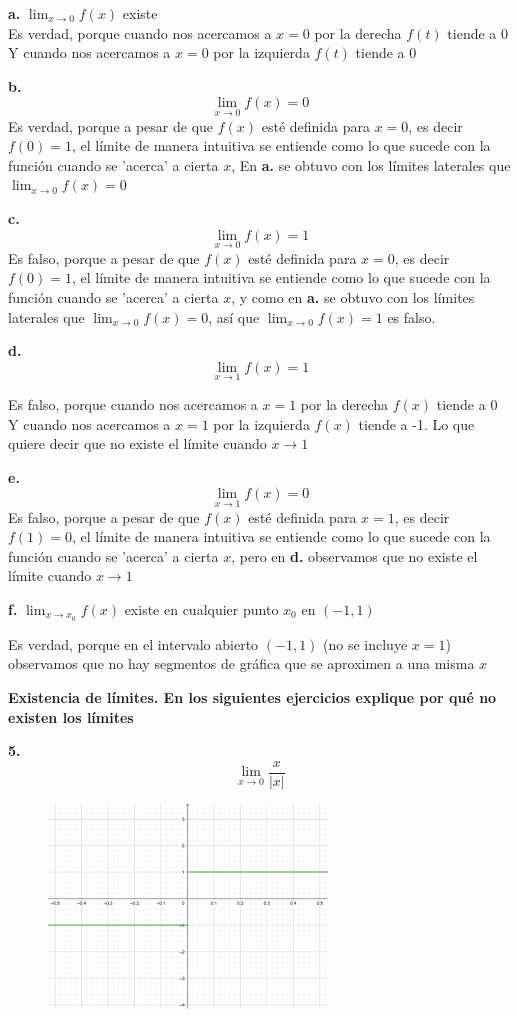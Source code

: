 \documentclass[12pt, letterpaper]{article}
\begin{document}
\textbf{a.} $\lim_{x \to 0} f(x)$ existe \\
Es verdad, porque cuando nos acercamos a $x = 0$  por la derecha $f(t)$ tiende a 0\\
Y cuando nos acercamos a $x = 0$ por la izquierda $f(t)$ tiende a 0

\textbf{b.} \[ \lim_{x \to 0} f(x) = 0\]
Es verdad, porque  a pesar de que  $f(x)$ esté definida para $x = 0$, es decir $f(0)= 1$, el límite de manera intuitiva se entiende como lo que sucede con la función cuando se  'acerca' a cierta $x$, En \textbf{a.} se obtuvo con los límites laterales  que $\lim_{x \to 0} f(x) = 0$

\textbf{c.} \[ \lim_{x \to 0} f(x) = 1\]
Es falso, porque  a pesar de que  $f(x)$ esté definida para $x = 0$, es decir $f(0)= 1$, el límite de manera intuitiva se entiende como lo que sucede con la función cuando se  'acerca' a cierta $x$, y como en \textbf{a.} se obtuvo con los límites laterales que $\lim_{x \to 0} f(x) = 0$, así que $\lim_{x \to 0} f(x) = 1$   es falso.

\textbf{d.} \[ \lim_{x \to 1} f(x) = 1\]

Es falso, porque cuando nos acercamos a $x = 1$  por la derecha $f(x)$ tiende a 0\\
Y cuando nos acercamos a $x = 1$ por la izquierda $f(x)$ tiende a -1. Lo que quiere decir que no existe el límite cuando $x \to 1$

\textbf{e.}  \[ \lim_{x \to 1} f(x) = 0\]
Es falso, porque  a pesar de que  $f(x)$ esté definida para $x = 1$, es decir $f(1)= 0$, el límite de manera intuitiva se entiende como lo que sucede con la función cuando se  'acerca' a cierta $x$, pero en \textbf{d.} observamos que no existe el límite cuando $x \to 1$

\textbf{f.} $\lim_{x \to x_0} f(x)$ existe en cualquier punto $x_0$ en $(-1,1)$

Es verdad, porque en el intervalo abierto $(-1,1)$ (no se incluye $x = 1$) observamos que no hay segmentos de gráfica que se aproximen a una misma $x$ 

\textbf{Existencia de límites. En los siguientes ejercicios explique por qué no existen los límites}

\textbf{5.} \[ \lim_{x \to 0} \frac{x}{|x|}\]

\begin{figure}[ht]
\centering
\includegraphics[width=20em]{t8cuatro}
\end{figure}
\end{document}
